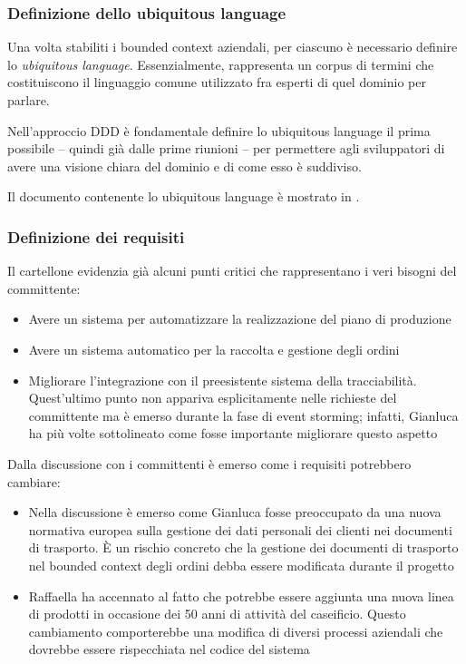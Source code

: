 \subsubsection{Definizione dello ubiquitous language}
\label{sec:seconda-riunione-ubiquitous-language}
Una volta stabiliti i bounded context aziendali, per ciascuno è necessario definire lo \emph{ubiquitous language}. Essenzialmente, rappresenta un corpus di termini che costituiscono il linguaggio comune utilizzato fra esperti di quel dominio per parlare.

Nell'approccio DDD è fondamentale definire lo ubiquitous language il prima possibile -- quindi già dalle prime riunioni -- per permettere agli sviluppatori di avere una visione chiara del dominio e di come esso è suddiviso.

Il documento contenente lo ubiquitous language è mostrato in .

\subsubsection{Definizione dei requisiti}
Il cartellone evidenzia già alcuni punti critici che rappresentano i veri bisogni del committente:
\begin{itemize}
  \item Avere un sistema per automatizzare la realizzazione del piano di produzione
  \item Avere un sistema automatico per la raccolta e gestione degli ordini
  \item Migliorare l'integrazione con il preesistente sistema della tracciabilità. Quest'ultimo punto non appariva esplicitamente nelle richieste del committente ma è emerso durante la fase di event storming; infatti, Gianluca ha più volte sottolineato come fosse importante migliorare questo aspetto
\end{itemize}

Dalla discussione con i committenti è emerso come i requisiti potrebbero cambiare:
\begin{itemize}
  \item Nella discussione è emerso come Gianluca fosse preoccupato da una nuova normativa europea sulla gestione dei dati personali dei clienti nei documenti di trasporto. È un rischio concreto che la gestione dei documenti di trasporto nel bounded context degli ordini debba essere modificata durante il progetto
  \item Raffaella ha accennato al fatto che potrebbe essere aggiunta una nuova linea di prodotti in occasione dei 50 anni di attività del caseificio. Questo cambiamento comporterebbe una modifica di diversi processi aziendali che dovrebbe essere rispecchiata nel codice del sistema
\end{itemize}

